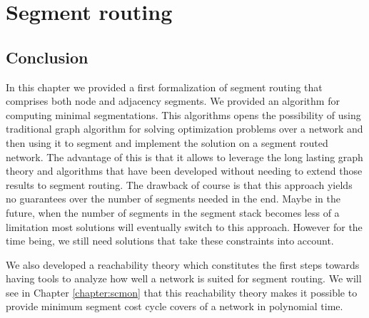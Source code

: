 \chapter{Segment routing}
\label{chapter:sr}









\section*{Conclusion}

In this chapter we provided a first formalization of segment routing that comprises both node and adjacency segments. 
We provided an algorithm for computing minimal segmentations. This algorithms opens the possibility of using traditional
graph algorithm for solving optimization problems over a network and then using it to segment and implement the solution on
a segment routed network. The advantage of this is that it allows to leverage the long lasting graph theory and
algorithms that have been developed without needing to extend those results to segment routing. The drawback of course
is that this approach yields no guarantees over the number of segments needed in the end. Maybe in the future, when the number
of segments in the segment stack becomes less of a limitation most solutions will eventually switch to this approach. However
for the time being, we still need solutions that take these constraints into account.

We also developed a reachability theory which constitutes the first steps towards having tools to analyze how well a network
is suited for segment routing. We will see in Chapter \ref{chapter:scmon} that this reachability theory makes it possible
to provide minimum segment cost cycle covers of a network in polynomial time.
